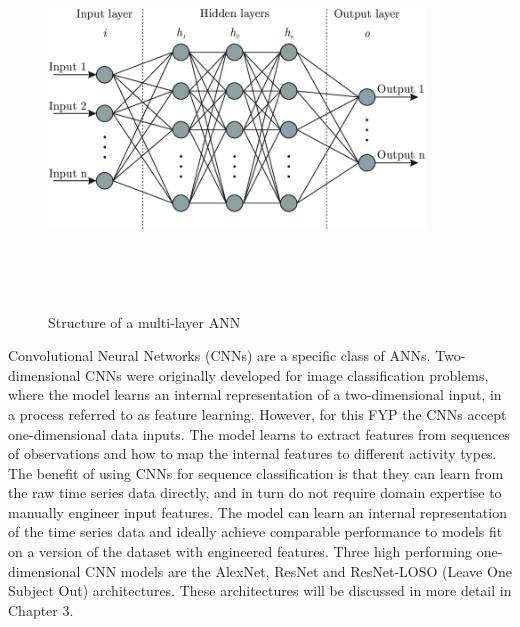  \begin{figure}[H]
    \centering
    \includegraphics[width=10cm,height=10cm,keepaspectratio]{Background/ann.png}
    \caption{Structure of a multi-layer ANN}
    \label{ann}
\end{figure}\noindent Convolutional Neural Networks (CNNs) are a specific class of 
ANNs. Two-dimensional CNNs were originally developed for image classification problems, 
where the model learns an internal representation of a two-dimensional input, in a 
process referred to as feature learning. However, for this FYP the CNNs accept one-dimensional data inputs. The model 
learns to extract features from sequences of observations and how to map the internal features 
to different activity types. The benefit of using CNNs for sequence classification is that they 
can learn from the raw time series data directly, and in turn do not require domain expertise 
to manually engineer input features. The model can learn an internal representation of the 
time series data and ideally achieve comparable performance to models fit on a version of the 
dataset with engineered features. Three high performing one-dimensional CNN models are the AlexNet, ResNet and 
ResNet-LOSO (Leave One Subject Out) architectures. These architectures will be discussed in more detail 
in Chapter 3.

